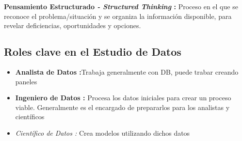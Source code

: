 \textbf{Pensamiento Estructurado\textit{ - Structured Thinking} : }Proceso en el que se reconoce el problema/situación y se organiza la información disponible, para revelar deficiencias, oportunidades y opciones.

\subsection{Roles clave en el Estudio de Datos}
\begin{itemize}
    \item {\textbf{Analista de Datos :}Trabaja generalmente con DB, puede trabar creando paneles}
    \item {\textbf{Ingeniero de Datos : }Procesa los datos iniciales para crear un proceso viable. Generalmente es el encargado de prepararlos para los analistas y científicos}
    \item {\textit{Científico de Datos : }Crea modelos utilizando dichos datos}
\end{itemize}

\newpage